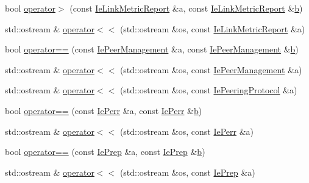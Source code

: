 \begin{DoxyCompactItemize}
\item 
bool \hyperlink{namespacens3_1_1dot11s_a3b004e1f897b553adb22c45f5e3ea45a}{operator$>$} (const \hyperlink{classns3_1_1dot11s_1_1IeLinkMetricReport}{Ie\+Link\+Metric\+Report} \&a, const \hyperlink{classns3_1_1dot11s_1_1IeLinkMetricReport}{Ie\+Link\+Metric\+Report} \&\hyperlink{lte__pathloss_8m_a21ad0bd836b90d08f4cf640b4c298e7c}{b})
\item 
std\+::ostream \& \hyperlink{namespacens3_1_1dot11s_a89ead06e9318289d69ed6fbfb1de8924}{operator$<$$<$} (std\+::ostream \&os, const \hyperlink{classns3_1_1dot11s_1_1IeLinkMetricReport}{Ie\+Link\+Metric\+Report} \&a)
\item 
bool \hyperlink{namespacens3_1_1dot11s_a61409b652bdbb029d73d8f91109cf72d}{operator==} (const \hyperlink{classns3_1_1dot11s_1_1IePeerManagement}{Ie\+Peer\+Management} \&a, const \hyperlink{classns3_1_1dot11s_1_1IePeerManagement}{Ie\+Peer\+Management} \&\hyperlink{lte__pathloss_8m_a21ad0bd836b90d08f4cf640b4c298e7c}{b})
\item 
std\+::ostream \& \hyperlink{namespacens3_1_1dot11s_a89ba4dd621cbd226af1aa1fc2c66c15a}{operator$<$$<$} (std\+::ostream \&os, const \hyperlink{classns3_1_1dot11s_1_1IePeerManagement}{Ie\+Peer\+Management} \&a)
\item 
std\+::ostream \& \hyperlink{namespacens3_1_1dot11s_a9d76f1596aa3354e1eeda8ddad0a5ac7}{operator$<$$<$} (std\+::ostream \&os, const \hyperlink{classns3_1_1dot11s_1_1IePeeringProtocol}{Ie\+Peering\+Protocol} \&a)
\item 
bool \hyperlink{namespacens3_1_1dot11s_ad65ce7ffbc9dd8e7ba1d8771fca1bc55}{operator==} (const \hyperlink{classns3_1_1dot11s_1_1IePerr}{Ie\+Perr} \&a, const \hyperlink{classns3_1_1dot11s_1_1IePerr}{Ie\+Perr} \&\hyperlink{lte__pathloss_8m_a21ad0bd836b90d08f4cf640b4c298e7c}{b})
\item 
std\+::ostream \& \hyperlink{namespacens3_1_1dot11s_a28e70b28570f80f59f0531d995b2cc0c}{operator$<$$<$} (std\+::ostream \&os, const \hyperlink{classns3_1_1dot11s_1_1IePerr}{Ie\+Perr} \&a)
\item 
bool \hyperlink{namespacens3_1_1dot11s_ae66899f8527cbcb352641ad7be578d3c}{operator==} (const \hyperlink{classns3_1_1dot11s_1_1IePrep}{Ie\+Prep} \&a, const \hyperlink{classns3_1_1dot11s_1_1IePrep}{Ie\+Prep} \&\hyperlink{lte__pathloss_8m_a21ad0bd836b90d08f4cf640b4c298e7c}{b})
\item 
std\+::ostream \& \hyperlink{namespacens3_1_1dot11s_aba902fc751de915aef23553575d43c57}{operator$<$$<$} (std\+::ostream \&os, const \hyperlink{classns3_1_1dot11s_1_1IePrep}{Ie\+Prep} \&a)

\end{DoxyCompactItemize}

